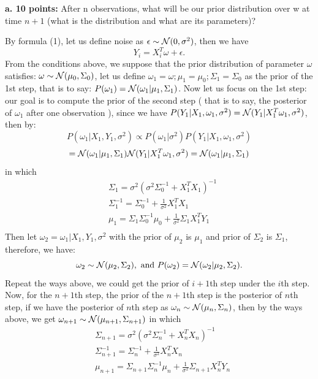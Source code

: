 \documentclass[letterpaper,10pt]{article}
\newcommand{\Nc}{{\cal N}}
\begin{document}
\begin{framed}
\textbf{a. 10 points:} After n observations, what will be our prior distribution over w at time $n+1$ (what is the distribution and what are its parameters)?
\end{framed}
By formula (1), let us define noise as $\epsilon \sim \Nc (0, \sigma^2)$, then we have
$$
Y_i = X_i^T \omega + \epsilon.
$$
From the conditions above, we suppose that the prior distribution of parameter $\omega$ satisfies: $\omega \sim \Nc (\mu_0, \Sigma_0)$, let us define $\omega_{1} = \omega; \mu_1 =\mu_0; \Sigma_1 = \Sigma_0$ as the prior of the 1st step, that is to say: $P(\omega_{1}) = \Nc (\omega_1 | \mu_1, \Sigma_1)$. Now let us focus on the 1st step: our goal is to compute the prior of the second step ( that is to say, the posterior of $\omega_1$ after one observation ), since we have $P(Y_1|X_1,\omega_1,\sigma^2 ) = \Nc (Y_1|X_1^T \omega_1, \sigma^2)$, then by:
$$
P(\omega_1 | X_1, Y_1, \sigma^2) \propto P(\omega_1 | \sigma^2) P(Y_1| X_1, \omega_1, \sigma^2)
$$
$$
= \Nc (\omega_1 | \mu_1, \Sigma_1) \Nc (Y_1|X_1^T \omega_1, \sigma^2) = \Nc(\omega_1| \mu_{1}, \Sigma_{1})
$$
in which
\begin{align*}
& \Sigma_{1} = \sigma^2(\sigma^2 \Sigma_0^{-1} + X_1^TX_1)^{-1}\\
& \Sigma_{1}^{-1} = \Sigma_0^{-1} + \frac{1}{\sigma^2} X_1^TX_1 \\
& \mu_{1} = \Sigma_{1} \Sigma_0^{-1} \mu_0 + \frac{1}{\sigma^2} \Sigma_{1} X_1^T Y_1 \\
\end{align*}
Then let $\omega_2 = \omega_1 | X_1, Y_1, \sigma^2$ with the prior of $\mu_2$ is $\mu_{1}$ and prior of $\Sigma_2$ is $\Sigma_{1}$, therefore, we have:
$$
\omega_2 \sim \Nc (\mu_2, \Sigma_2), \text{ and } P(\omega_2) = \Nc (\omega_2| \mu_2, \Sigma_2).
$$
Repeat the ways above, we could get the prior of $i+1$th step under the $i$th step. Now, for the $n+1$th step, the prior of the $n+1$th step is the posterior of $n$th step, if we have the posterior of $n$th step as $\omega_n \sim \Nc(\mu_n, \Sigma_n)$, then by the ways above, we get $\omega_{n+1}\sim \Nc(\mu_{n+1}, \Sigma_{n+1})$ in which
\begin{align*}
& \Sigma_{n+1}  = \sigma^2(\sigma^2 \Sigma_n^{-1} + X_n^TX_n)^{-1}\\
& \Sigma_{n+1}^{-1} = \Sigma_n^{-1} + \frac{1}{\sigma^2} X_n^TX_n \\
& \mu_{n+1} = \Sigma_{n+1} \Sigma_n^{-1} \mu_n + \frac{1}{\sigma^2} \Sigma_{n+1} X_n^T Y_n \\
\end{align*}
\end{document}

